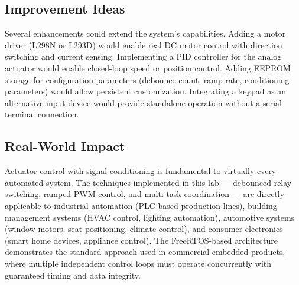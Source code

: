 \subsection{Improvement Ideas}

Several enhancements could extend the system's capabilities. Adding a motor driver (L298N or L293D) would enable real DC motor control with direction switching and current sensing. Implementing a PID controller for the analog actuator would enable closed-loop speed or position control. Adding EEPROM storage for configuration parameters (debounce count, ramp rate, conditioning parameters) would allow persistent customization. Integrating a keypad as an alternative input device would provide standalone operation without a serial terminal connection.

\subsection{Real-World Impact}

Actuator control with signal conditioning is fundamental to virtually every automated system. The techniques implemented in this lab --- debounced relay switching, ramped PWM control, and multi-task coordination --- are directly applicable to industrial automation (PLC-based production lines), building management systems (HVAC control, lighting automation), automotive systems (window motors, seat positioning, climate control), and consumer electronics (smart home devices, appliance control). The FreeRTOS-based architecture demonstrates the standard approach used in commercial embedded products, where multiple independent control loops must operate concurrently with guaranteed timing and data integrity.
